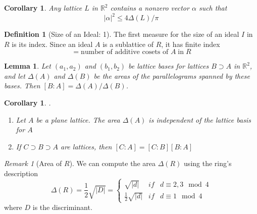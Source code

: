 \documentclass[12pt]{article}
\newtheorem{lem}[thm]{Lemma}  %
\newtheorem{cor}[thm]{Corollary}
\theoremstyle{definition}
\newtheorem{defn}[thm]{Definition}
\theoremstyle{remark}
\newtheorem{rmk}[thm]{Remark}
\numberwithin{equation}{section}
\newcommand\R{\mathbb R}    %
\begin{document}
\vspace{15pt}

\begin{cor}
        Any lattice $L$ in $\R^2$ contains a nonzero vector $\alpha$ such that \begin{equation}
                |\alpha|^2 \leq 4\Delta(L)/\pi
        \end{equation}
\end{cor}


\vspace{15pt}

\begin{defn}[Size of an Ideal: 1]
        The first measure for the size of an ideal $I$ in $R$ is its index. Since an ideal $A$ is a sublattice of $R$, it has finite index \begin{equation}
                [R:A] = \text{number of additive cosets of } A\;\text{in}\; R
        \end{equation}
\end{defn}

\vspace{15pt}

\begin{lem}
        Let $(a_1,a_2)$ and $(b_1,b_2)$ be lattice bases for lattices $B \supset A$ in $\R^2$, and let $\Delta(A)$ and $\Delta(B)$ be the areas of the parallelograms spanned by these bases. Then $[B:A] = \Delta(A)/\Delta(B)$.
\end{lem}

\vspace{15pt} 


\begin{cor}
        .\newline\begin{enumerate}
                \item Let $A$ be a plane lattice. The area $\Delta(A)$ is independent of the lattice basis for $A$
                \item If $C \supset B \supset A$ are lattices, then $[C:A] = [C:B][B:A]$
        \end{enumerate}
\end{cor}


\vspace{15pt}

\begin{rmk}[Area of $R$]
        We can compute the area $\Delta(R)$ using the ring's description \begin{equation}
                        \Delta(R) = \frac{1}{2}\sqrt{|D|} = \left\{\begin{array}{ccc} \sqrt{|d|} & if & d \equiv 2,3 \mod 4 \\ \frac{1}{2}\sqrt{|d|} & if & d \equiv 1 \mod 4 \end{array}\right.
        \end{equation}
        where $D$ is the discriminant. 
\end{rmk}
\end{document}
